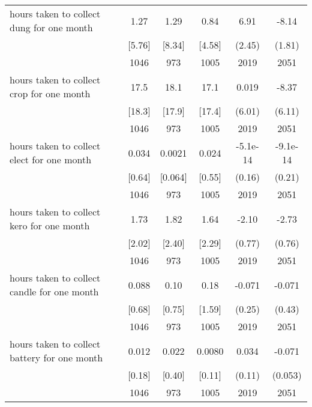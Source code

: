 \begin{table}[htbp]
\begin{tabular*}{0.9\hsize}{@{\hskip\tabcolsep\extracolsep\fill}l*{1}{ccccc}}
hours taken to collect dung for one month&     1.27&     1.29&     0.84&     6.91\sym{***}&    -8.14\sym{***}\\
                                &   [5.76]&   [8.34]&   [4.58]&   (2.45)         &   (1.81)         \\
                                &     1046&      973&     1005&     2019         &     2051         \\
hours taken to collect crop for one month&     17.5&     18.1&     17.1&    0.019         &    -8.37         \\
                                &   [18.3]&   [17.9]&   [17.4]&   (6.01)         &   (6.11)         \\
                                &     1046&      973&     1005&     2019         &     2051         \\
hours taken to collect elect for one month&    0.034&   0.0021&    0.024& -5.1e-14         & -9.1e-14         \\
                                &   [0.64]&  [0.064]&   [0.55]&   (0.16)         &   (0.21)         \\
                                &     1046&      973&     1005&     2019         &     2051         \\
hours taken to collect kero for one month&     1.73&     1.82&     1.64&    -2.10\sym{***}&    -2.73\sym{***}\\
                                &   [2.02]&   [2.40]&   [2.29]&   (0.77)         &   (0.76)         \\
                                &     1046&      973&     1005&     2019         &     2051         \\
hours taken to collect candle for one month&    0.088&     0.10&     0.18&   -0.071         &   -0.071         \\
                                &   [0.68]&   [0.75]&   [1.59]&   (0.25)         &   (0.43)         \\
                                &     1046&      973&     1005&     2019         &     2051         \\
hours taken to collect battery for one month&    0.012&    0.022&   0.0080&    0.034         &   -0.071         \\
                                &   [0.18]&   [0.40]&   [0.11]&   (0.11)         &  (0.053)         \\
                                &     1046&      973&     1005&     2019         &     2051         \\

\end{tabular*}
\end{table}
